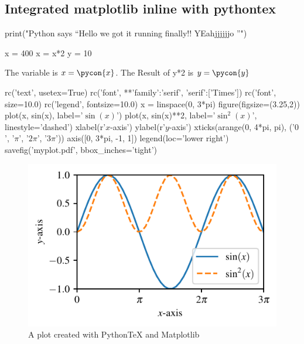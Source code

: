 \subsection{Integrated matplotlib inline with pythontex}


\begin{pycode}


print("Python says ``Hello we got it running finally!! YEahjjjjjjo ''")

\end{pycode}
\begin{pyconsole}
x = 400
x = x*2
y = 10
\end{pyconsole}
The variable is $x=\pycon{x}$. 
The Result of y*2 is $y=\pycon{y}$


\begin{pylabcode}[plotsession]
rc('text', usetex=True)
rc('font', **{'family':'serif', 'serif':['Times']})
rc('font', size=10.0)			
rc('legend', fontsize=10.0)
x = linspace(0, 3*pi)
figure(figsize=(3.25,2))
plot(x, sin(x), label='$\sin(x)$')
plot(x, sin(x)**2, label='$\sin^2(x)$',
linestyle='dashed')
xlabel(r'$x$-axis')
ylabel(r'$y$-axis')
xticks(arange(0, 4*pi, pi), ('$0$',
'$\pi$', '$2\pi$', '$3\pi$'))
axis([0, 3*pi, -1, 1])
legend(loc='lower right')
savefig('myplot.pdf', bbox_inches='tight')
\end{pylabcode}

\begin{figure}[h!]
\includegraphics{myplot}
\caption{\label{fig:matplotlib} A plot created with PythonTeX and Matplotlib}
\end{figure}

